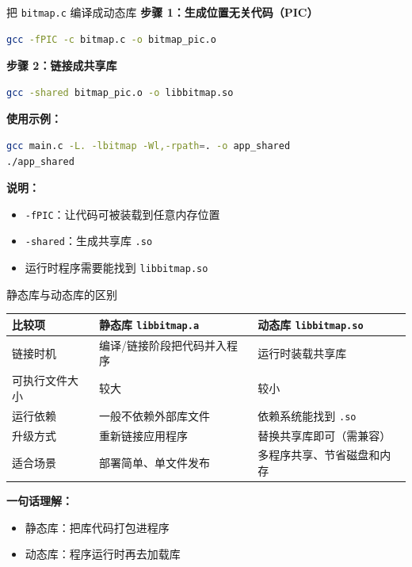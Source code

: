 \documentclass[aspectratio=169,11pt]{beamer}
\begin{document}
\begin{frame}[fragile]{把 \texttt{bitmap.c} 编译成动态库}
\textbf{步骤 1：生成位置无关代码（PIC）}
\begin{lstlisting}[language=bash]
gcc -fPIC -c bitmap.c -o bitmap_pic.o
\end{lstlisting}

\textbf{步骤 2：链接成共享库}
\begin{lstlisting}[language=bash]
gcc -shared bitmap_pic.o -o libbitmap.so
\end{lstlisting}

\textbf{使用示例：}
\begin{lstlisting}[language=bash]
gcc main.c -L. -lbitmap -Wl,-rpath=. -o app_shared
./app_shared
\end{lstlisting}

\textbf{说明：}
\begin{itemize}
  \item \texttt{-fPIC}：让代码可被装载到任意内存位置
  \item \texttt{-shared}：生成共享库 \texttt{.so}
  \item 运行时程序需要能找到 \texttt{libbitmap.so}
\end{itemize}
\end{frame}

\begin{frame}{静态库与动态库的区别}
\small
\begin{center}
\begin{tabular}{p{2.6cm}p{4.2cm}p{4.2cm}}
\toprule
比较项 & 静态库 \texttt{libbitmap.a} & 动态库 \texttt{libbitmap.so} \\
\midrule
链接时机 & 编译/链接阶段把代码并入程序 & 运行时装载共享库 \\
可执行文件大小 & 较大 & 较小 \\
运行依赖 & 一般不依赖外部库文件 & 依赖系统能找到 \texttt{.so} \\
升级方式 & 重新链接应用程序 & 替换共享库即可（需兼容） \\
适合场景 & 部署简单、单文件发布 & 多程序共享、节省磁盘和内存 \\
\bottomrule
\end{tabular}
\end{center}

\vspace{0.6em}
\textbf{一句话理解：}
\begin{itemize}
  \item 静态库：\alert{把库代码打包进程序}
  \item 动态库：\alert{程序运行时再去加载库}
\end{itemize}
\end{frame}
\end{document}
